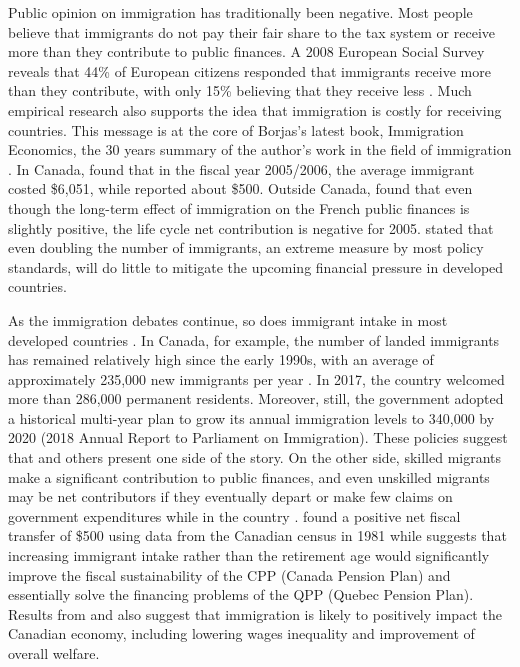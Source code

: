 \vspace{0.7em}\par
Public opinion on immigration has traditionally been negative. Most people believe that immigrants do not pay their fair share to the tax system or receive more than they contribute to public finances.
A 2008 European Social Survey reveals that 44\% of European citizens responded that immigrants receive more than they contribute, with only 15\% believing that they receive less \citep{Dustmann:2014dr}.
Much empirical research also supports the idea that immigration is costly for receiving countries.
This message is at the core of Borjas's latest book, Immigration Economics, the 30 years summary of the author's work in the field of immigration \citep{Card:2016ku}.
In Canada, \citet{Grubel:2012wo} found that in the fiscal year 2005/2006, the average immigrant costed \$6,051, while \citet{Javdani:2013gu} reported about \$500.
Outside Canada, \citet{Chojnicki:2011vu} found that even though the long-term effect of immigration on the French public finances is slightly positive, the life cycle net contribution is negative for 2005.
\citet{Fehr:2003gq} stated that even doubling the number of immigrants, an extreme measure by most policy standards, will do little to mitigate the upcoming financial pressure in developed countries.

\vspace{0.7em}\par
As the immigration debates continue, so does immigrant intake in most developed countries \citep{Card:2016ku}.
In Canada, for example, the number of landed immigrants has remained relatively high since the early 1990s, with an average of approximately 235,000 new immigrants per year \citep{StatistiqueCanada:2016ud}.
In 2017, the country welcomed more than 286,000 permanent residents. Moreover, still, the government adopted a historical multi-year plan to grow its annual immigration levels to 340,000 by 2020 (2018 Annual Report to Parliament on Immigration).
These policies suggest that \citet{Borjas:2014hr} and others present one side of the story. On the other side, skilled migrants make a significant contribution to public finances, and even unskilled migrants may be net contributors if they eventually depart or make few claims on government expenditures while in the country \citep{Rowthorn:2008kk}.
\citet{Akbari:1989fh} found a positive net fiscal transfer of \$500 using data from the Canadian census in 1981 while \citet{Hering.Klassen.2010} suggests that increasing immigrant intake rather than the retirement age would significantly improve the fiscal sustainability of the CPP (Canada Pension Plan) and essentially solve the financing problems of the QPP (Quebec Pension Plan).
Results from \citet{Ileri:2019hf} and \citet{Dungan:2013jp} also suggest that immigration is likely to positively impact the Canadian economy, including lowering wages inequality and improvement of overall welfare.

